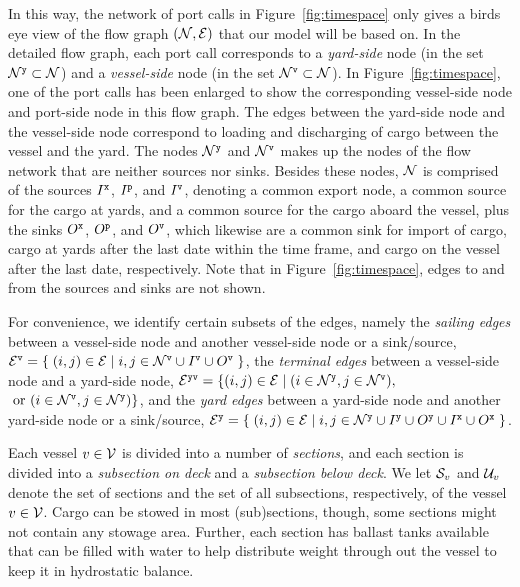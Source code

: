 In this way, the network of port calls in Figure~\ref{fig:timespace} only gives a birds eye view of the flow graph $(\mathcal{N},\mathcal{E})$ that our model will be based on. In the detailed flow graph, each port call corresponds to a \emph{yard-side} node (in the set $\mathcal{N}^\texttt{y}\subset \mathcal{N}$) and a \emph{vessel-side} node (in the set $\mathcal{N}^\texttt{v}\subset\mathcal{N}$). In Figure~\ref{fig:timespace}, one of the port calls has been enlarged to show the corresponding vessel-side node and port-side node in this flow graph. The edges between the yard-side node and the vessel-side node correspond to loading and discharging of cargo between the vessel and the yard. The nodes $\mathcal{N}^\texttt{y}$ and $\mathcal{N}^\texttt{v}$ makes up the nodes of the flow network that are neither sources nor sinks. %
Besides these nodes, $\mathcal{N}$ is comprised of the sources $I^\texttt{x}$, $I^\texttt{p}$, and $I^\texttt{v}$, denoting a common export node, a common source for the cargo at yards, and a common source for the cargo aboard the vessel, plus the sinks $O^\texttt{x}$, $O^\texttt{p}$, and $O^\texttt{v}$, which likewise are a common sink for import of cargo, cargo at yards after the last date within the time frame, and cargo on the vessel after the last date, respectively. Note that in Figure~\ref{fig:timespace}, edges to and from the sources and sinks are not shown.

For convenience, we identify certain subsets of the edges, namely the \emph{sailing edges} between a vessel-side node and another vessel-side node or a sink/source, $\mathcal{E}^{\texttt{v}} =\{\;{(i,j)\in \mathcal{E}}\;|\;{i,j\in \mathcal{N}^\texttt{v}\cup I^\texttt{v}\cup O^\texttt{v}}\;\}$,  
the \emph{terminal edges} between a vessel-side node and a yard-side node, $\mathcal{E}^\texttt{yv}=\{(i,j)\in \mathcal{E}\;|\;(i\in \mathcal{N}^\texttt{y}, j\in \mathcal{N}^\texttt{v}),$ $\text{ or } (i\in \mathcal{N}^\texttt{v}, j\in \mathcal{N}^\texttt{y})\}$, and the \emph{yard edges} between a yard-side node and another yard-side node or a sink/source, $\mathcal{E}^{\texttt{y}} =\{\;{(i,j)\in \mathcal{E}}\;|\;{i,j\in \mathcal{N}^\texttt{y}\cup I^\texttt{y}\cup O^\texttt{y}\cup I^\texttt{x}\cup O^\texttt{x}}\;\}$.

Each vessel $v\in\mathcal{V}$ is divided into a number of \emph{sections}, and each section is divided into a \emph{subsection on deck} and a \emph{subsection below deck}. We let $\mathcal{S}_v$ and $\mathcal{U}_v$ denote the set of sections and the set of all subsections, respectively, of the vessel $v\in \mathcal{V}$.
Cargo can be stowed in most (sub)sections, though, some sections might not contain any stowage area. Further, each section has ballast tanks available that can be filled with water to help distribute weight through out the vessel to keep it in hydrostatic balance.

